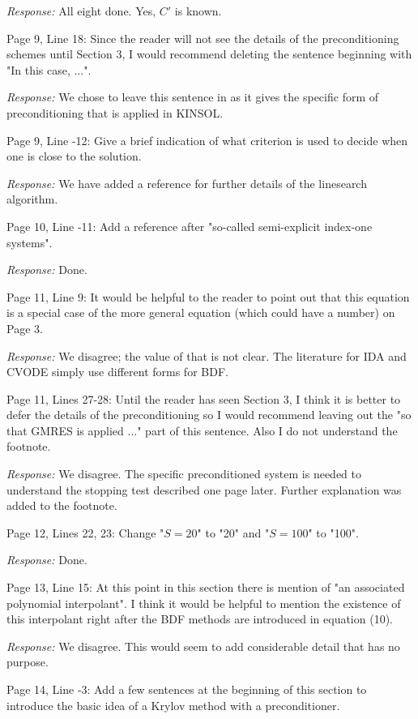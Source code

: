 \documentclass[12pt]{letter}
\begin{document}
{\em Response:} All eight done. Yes, $C'$ is known.

Page 9, Line 18: Since the reader will not see the details of the
preconditioning schemes until Section 3, I would recommend deleting
the sentence beginning with "In this case, ...".

{\em Response: } We chose to leave this sentence in as it gives the
specific form of preconditioning that is applied in KINSOL.

Page 9, Line -12: Give a brief indication of what criterion is used to
decide when one is close to the solution.

{\em Response: } We have added a reference for further details of
the linesearch algorithm.

Page 10, Line -11: Add a reference after "so-called semi-explicit
index-one systems".

{\em Response:} Done.

Page 11, Line 9: It would be helpful to the reader to point out that
this equation is a special case of the more general equation (which
could have a number) on Page 3.

{\em Response:} We disagree; the value of that is not clear.  The
literature for IDA and CVODE simply use different forms for BDF.

Page 11, Lines 27-28: Until the reader has seen Section 3, I think it
is better to defer the details of the preconditioning so I would
recommend leaving out the "so that GMRES is applied ..."  part of this
sentence. Also I do not understand the footnote.

{\em Response:} We disagree.  The specific preconditioned system is needed
to understand the stopping test described one page later. Further
explanation was added to the footnote.

Page 12, Lines 22, 23: Change "$S = 20$" to "20" and "$S = 100$" to "100".

{\em Response:} Done.

Page 13, Line 15: At this point in this section there is mention of "an
associated polynomial interpolant".  I think it would be helpful to
mention the existence of this interpolant right after the BDF methods
are introduced in equation (10).

{\em Response:} We disagree.  This would seem to add considerable
detail that has no purpose.

Page 14, Line -3: Add a few sentences at the beginning of this section
to introduce the basic idea of a Krylov method with a preconditioner.
\end{document}
